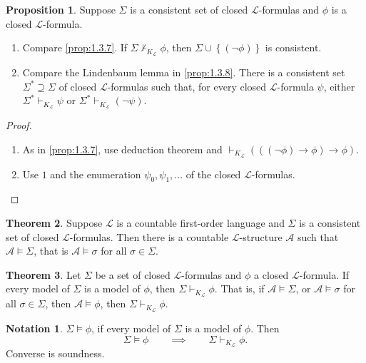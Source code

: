 \documentclass{article}
\newcommand{\A}{\mathcal{A}}
\renewcommand{\L}{\mathcal{L}}
\newcommand{\rb}[1]{\left( #1 \right)}
\newcommand{\cb}[1]{\left\{ #1 \right\}}
\newcommand{\notb}[1]{\rb{\neg #1}}
\newcommand{\impb}[2]{\rb{#1 \rightarrow #2}}
\theoremstyle{definition}\newtheorem{definition}{Definition}[subsection]
\theoremstyle{definition}\newtheorem{remark1}[definition]{Remark}
\theoremstyle{definition}\newtheorem{example1}[definition]{Example}
\theoremstyle{definition}\newtheorem*{remark2}{Remark}
\theoremstyle{definition}\newtheorem*{example2}{Example}
\theoremstyle{definition}\newtheorem*{note}{Note}
\theoremstyle{definition}\newtheorem*{notation}{Notation}
\newtheorem{proposition}[definition]{Proposition}
\newtheorem{theorem}[definition]{Theorem}
\begin{document}
\begin{proposition}
\label{prop:2.5.2}
Suppose $ \Sigma $ is a consistent set of closed $ \L $-formulas and $ \phi $ is a closed $ \L $-formula.
\begin{enumerate}
\item Compare \ref{prop:1.3.7}. If $ \Sigma \not\vdash_{K_{\L}} \phi $, then $ \Sigma \cup \cb{\notb{\phi}} $ is consistent.
\item Compare the Lindenbaum lemma in \ref{prop:1.3.8}. There is a consistent set $ \Sigma^* \supseteq \Sigma $ of closed $ \L $-formulas such that, for every closed $ \L $-formula $ \psi $, either $ \Sigma^* \vdash_{K_{\L}} \psi $ or $ \Sigma^* \vdash_{K_{\L}} \notb{\psi} $.
\end{enumerate}
\end{proposition}

\begin{proof}
\hfill
\begin{enumerate}
\item As in \ref{prop:1.3.7}, use deduction theorem and $ \vdash_{K_{\L}} \impb{\impb{\notb{\phi}}{\phi}}{\phi} $.
\item Use $ 1 $ and the enumeration $ \psi_0, \psi_1, \dots $ of the closed $ \L $-formulas.
\end{enumerate}
\end{proof}

\pagebreak

\begin{theorem}
\label{thm:2.5.3}
Suppose $ \L $ is a countable first-order language and $ \Sigma $ is a consistent set of closed $ \L $-formulas. Then there is a countable $ \L $-structure $ \A $ such that $ \A \vDash \Sigma $, that is $ \A \vDash \sigma $ for all $ \sigma \in \Sigma $.
\end{theorem}

\begin{theorem}
\label{thm:2.5.4}
Let $ \Sigma $ be a set of closed $ \L $-formulas and $ \phi $ a closed $ \L $-formula. If every model of $ \Sigma $ is a model of $ \phi $, then $ \Sigma \vdash_{K_{\L}} \phi $. That is, if $ \A \vDash \Sigma $, or $ \A \vDash \sigma $ for all $ \sigma \in \Sigma $, then $ \A \vDash \phi $, then $ \Sigma \vdash_{K_{\L}} \phi $.
\end{theorem}

\begin{notation}
$ \Sigma \vDash \phi $, if every model of $ \Sigma $ is a model of $ \phi $. Then
$$ \Sigma \vDash \phi \qquad \implies \qquad \Sigma \vdash_{K_{\L}} \phi. $$ Converse is soundness.
\end{notation}
\end{document}
